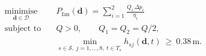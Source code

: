 \[
\begin{aligned}
\underset{\mathbf d\in\mathcal D}{\text{minimise}}\quad
 & P_{\mathrm{fan}}(\mathbf d)=\sum_{i=1}^{2}\frac{Q_i\,\Delta p_i}{\eta_i}\\
\text{subject to}\quad
 & Q>0,\qquad Q_1=Q_2=Q/2,\\
 & \min_{s\in\mathcal S,\ j=1,\ldots,8,\ t\in T_s}
     h_{sj}(\mathbf d,t)\ \geq\ 0.38\,\mathrm{m}.
\end{aligned}
\]
